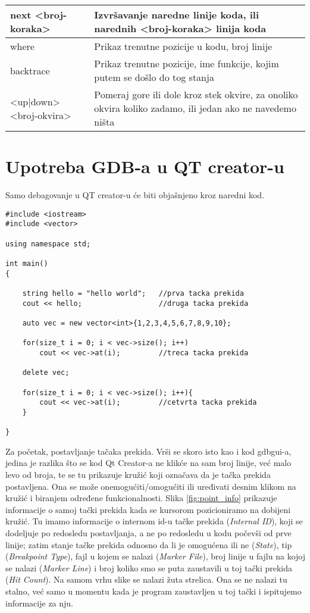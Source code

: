 \documentclass[a4paper]{article}
\begin{document}
\begin{table}[H]
\begin{center}
\begin{tabular}{|p{4cm}|p{6cm}|}
next <broj-koraka> & Izvršavanje naredne linije koda, ili narednih <broj-koraka> linija koda \\ \hline
where & Prikaz trenutne pozicije u kodu, broj linije \\ \hline
backtrace & Prikaz trenutne pozicije, ime funkcije, kojim putem se došlo do tog stanja\\ \hline
<up|down><broj-okvira> & Pomeraj gore ili dole kroz stek okvire, za onoliko okvira koliko zadamo, ili jedan ako ne navedemo ništa \\ \hline
\end{tabular}
\label{tab:tabelaKonzola}
\end{center}
\end{table}


\section{Upotreba GDB-a u QT creator-u}
\label{upotrebaQT}
Samo debagovanje u QT creator-u će biti objašnjeno kroz naredni kod.

\begin{lstlisting}[caption={Primer jednostavnog programa za prikaz rada GDB-a u Qt Creator-u},frame=single, label=simple]
#include <iostream>
#include <vector>

using namespace std;

int main()
{

    string hello = "hello world";   //prva tacka prekida
    cout << hello;                  //druga tacka prekida

    auto vec = new vector<int>{1,2,3,4,5,6,7,8,9,10};

    for(size_t i = 0; i < vec->size(); i++)
        cout << vec->at(i);         //treca tacka prekida

    delete vec;

    for(size_t i = 0; i < vec->size(); i++){
        cout << vec->at(i);         //cetvrta tacka prekida
    }

}
\end{lstlisting}

Za početak, postavljanje tačaka prekida. Vrši se skoro isto kao i kod gdbgui-a, jedina je razlika što se kod Qt Creator-a ne klikće na sam broj linije,
već malo levo od broja, te se tu prikazuje kružić koji označava da je
tačka prekida postavljena. Ona se može onemogućiti/omogućiti ili uređivati desnim klikom na kružić i biranjem određene funkcionalnosti.
Slika \ref{fig:point_info} prikazuje informacije o samoj tački prekida kada se
kursorom pozicioniramo na dobijeni kružić. Tu imamo informacije o internom id-u tačke prekida (\textit{Internal ID}), koji se dodeljuje
po redosledu postavljanja, a ne po redosledu u kodu počevši od prve linije; zatim stanje tačke prekida
odnosno da li je omogućena ili ne (\textit{State}), tip (\textit{Breakpoint Type}),
fajl u kojem se nalazi (\textit{Marker File}), broj linije u fajlu na kojoj se nalazi (\textit{Marker Line})
i broj koliko smo se puta zaustavili u toj tački prekida (\textit{Hit Count}).
Na samom vrhu slike se nalazi žuta strelica. Ona se ne nalazi tu stalno, već samo u momentu kada je program 
zaustavljen u toj tački i ispitujemo informacije za nju.
\end{document}
